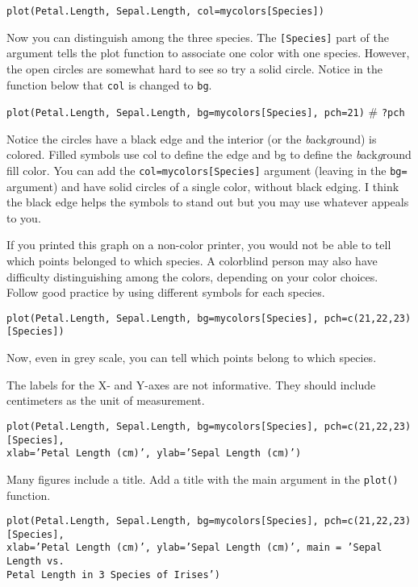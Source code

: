 \documentclass[11pt]{article}
\begin{document}
\texttt{plot(Petal.Length, Sepal.Length, col=mycolors{[}Species{]})}

Now you can distinguish among the three species. The \texttt{{[}Species{]}} part
of the argument tells the plot function to associate one color with one
species. However, the open circles are somewhat hard to see so try a
solid circle. Notice in the function below that \texttt{col} is changed to \texttt{bg}.

\texttt{plot(Petal.Length, Sepal.Length, bg=mycolors{[}Species{]}, pch=21)} \#
\texttt{?pch}

Notice the circles have a black edge and the interior (or the
\emph{b}ack\emph{g}round) is colored. Filled symbols use col to define
the edge and bg to define the \emph{b}ack\emph{g}round fill color. You
can add the \texttt{col=mycolors{[}Species{]}} argument (leaving in the \texttt{bg=}
argument) and have solid circles of a single color, without black
edging. I think the black edge helps the symbols to stand out but you
may use whatever appeals to you.

If you printed this graph on a non-color printer, you would not be able
to tell which points belonged to which species. A colorblind person may
also have difficulty distinguishing among the colors, depending on your
color choices. Follow good practice by using different symbols for each
species. 

\texttt{plot(Petal.Length, Sepal.Length, bg=mycolors{[}Species{]},
pch=c(21,22,23){[}Species{]})}

Now, even in grey scale, you can tell which points belong to which
species.

The labels for the X- and Y-axes are not informative. They should
include centimeters as the unit of measurement.

\texttt{plot(Petal.Length, Sepal.Length, bg=mycolors{[}Species{]},
pch=c(21,22,23){[}Species{]}, \\xlab='Petal Length (cm)', ylab='Sepal
Length (cm)')}

Many figures include a title. Add a title with the main argument
in the \texttt{plot()} function.

\texttt{plot(Petal.Length, Sepal.Length, bg=mycolors{[}Species{]}, pch=c(21,22,23){[}Species{]}, \\
xlab='Petal Length (cm)', ylab='Sepal Length (cm)', main = 'Sepal Length vs. \\
Petal Length in 3 Species of Irises')}

\end{document}

